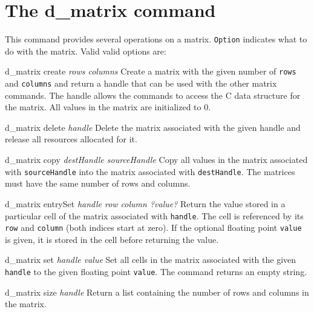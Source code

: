 \documentclass{article}
\newcommand{\dmatrix}{\textbf{d\_matrix}}
\begin{document}
\section{The \dmatrix{} command}
This command provides several operations on a matrix.
\texttt{Option} indicates what to do with the matrix. Valid valid
options are:
\begin{options}
\item[d\_matrix create \textsl{rows columns}]
Create a matrix with the given number of \texttt{rows} and
\texttt{columns} and return a handle that can be used with the other
matrix commands.  The handle allows the commands to access the C data
structure for the matrix.  All values in the matrix are initialized to
0.
\item[d\_matrix delete \textsl{handle}]
Delete the matrix associated with the given handle and release all
resources allocated for it.
\item[d\_matrix copy \textsl{destHandle sourceHandle}]
Copy all values in the matrix associated with \texttt{sourceHandle}
into the matrix associated with \texttt{destHandle}.  The matrices
must have the same number of rows and columns.
\item[d\_matrix entrySet \textsl{handle row column ?value?}]
Return the value stored in a particular cell of the matrix associated
with \texttt{handle}.  The cell is referenced by its \texttt{row} and
\texttt{column} (both indices start at zero).  If the optional
floating point \texttt{value} is given, it is stored in the cell
before returning the value.
\item[d\_matrix set \textsl{handle value}]
Set all cells in the matrix associated with the given \texttt{handle}
to the given floating point \texttt{value}.  The command returns an
empty string.
\item[d\_matrix size \textsl{handle}]
Return a list containing the number of rows and columns in the matrix.
\end{options}
\end{document}
